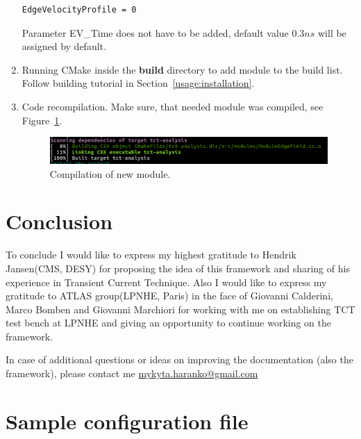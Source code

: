 \documentclass[12pt,oneside,notitlepage,abstracton,a4paper]{scrartcl}
\begin{document}
\begin{enumerate}
\begin{lstlisting}
EdgeVelocityProfile = 0
\end{lstlisting}
Parameter EV\_Time does not have to be added, default value $0.3 ns$ will be assigned by default.
\item Running CMake inside the \textbf{build} directory to add module to the build list. Follow building tutorial in Section~\ref{usage:installation}.
\item Code recompilation. Make sure, that needed module was compiled, see Figure~\ref{fig:compiling}.
\begin{figure}[H]
    \centering
    \includegraphics[width=13cm]{pics/compiling}
    \caption{Compilation of new module.}
    \label{fig:compiling}
\end{figure}
\end{enumerate}

\section{Conclusion}

To conclude I would like to express my highest gratitude to Hendrik Jansen(CMS, DESY) for proposing the idea of this framework and sharing of his experience in Transient Current Technique. Also I would like to express my gratitude to ATLAS group(LPNHE, Paris) in the face of Giovanni Calderini, Marco Bomben and Giovanni Marchiori for working with me on establishing TCT test bench at LPNHE and giving an opportunity to continue working on the framework.

In case of additional questions or ideas on improving the documentation (also the framework), please contact me \href{mailto:mykyta.haranko@gmail.com}{mykyta.haranko@gmail.com}
\clearpage 
\appendix
\section{Sample configuration file}\label{App:conf}
\end{document}

